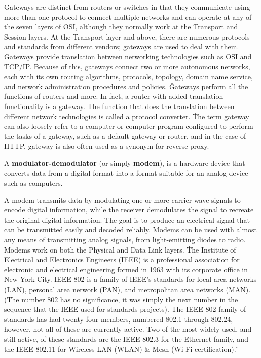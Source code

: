 
Gateways are distinct from routers or switches in that they communicate using more than one protocol to connect
multiple networks and can operate at any of the seven layers of OSI, although they normally work at the Transport and
Session layers. At the Transport layer and above, there are numerous protocols and standards from different vendors;
gateways are used to deal with them. Gateways provide translation between networking technologies such as OSI and
TCP/IP. Because of this, gateways connect two or more autonomous networks, each with its own routing algorithms,
protocols, topology, domain name service, and network administration procedures and policies. \v

Gateways perform all the functions of routers and more. In fact, a router with added translation functionality is a
gateway. The function that does the translation between different network technologies is called a protocol converter.
\v

The term gateway can also loosely refer to a computer or computer program configured to perform the tasks of a
gateway, such as a default gateway or router, and in the case of HTTP, gateway is also often used as a synonym for
reverse proxy.

\bd[Modem]
A \textbf{modulator-demodulator} (or simply \textbf{modem}), is a hardware device that converts data from a digital
format into a format suitable for an analog device such as computers.
\ed


A modem transmits data by modulating one or more carrier wave signals to encode digital information, while the
receiver demodulates the signal to recreate the original digital information. The goal is to produce an electrical
signal that can be transmitted easily and decoded reliably. Modems can be used with almost any means of transmitting
analog signals, from light-emitting diodes to radio. Modems work on both the Physical and Data Link layers. \v

The Institute of Electrical and Electronics Engineers (IEEE) is a professional association for electronic and
electrical engineering formed in 1963 with its corporate office in New York City. IEEE 802 is a family of IEEE's
standards for local area networks (LAN), personal area network (PAN), and metropolitan area networks (MAN). (The
number 802 has no significance, it was simply the next number in the sequence that the IEEE used for standards
projects). The IEEE 802 family of standards has had twenty-four members, numbered 802.1 through 802.24, however, not
all of these are currently active. Two of the most widely used, and still active, of these standards are the IEEE 802.3
for the Ethernet family, and the IEEE 802.11 for Wireless LAN (WLAN) \& Mesh (Wi-Fi certification). \v

